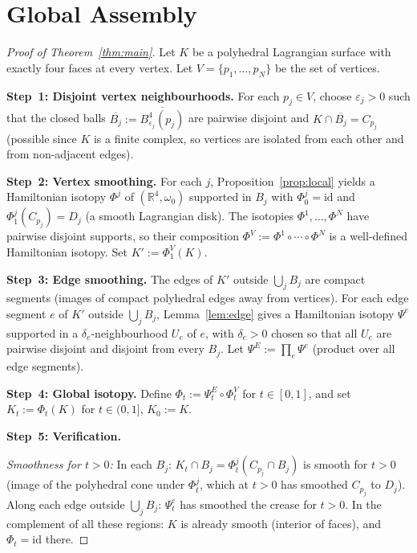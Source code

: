 \documentclass[12pt]{article}
\theoremstyle{definition}
\newcommand{\R}{\mathbb{R}}
\newcommand{\om}{\omega}
\newcommand{\eps}{\varepsilon}
\begin{document}
\section{Global Assembly}\label{sec:global}

\begin{proof}[Proof of Theorem~\ref{thm:main}]
Let $K$ be a polyhedral Lagrangian surface with exactly four faces at
every vertex.  Let $V=\{p_1,\dots,p_N\}$ be the set of vertices.

\medskip\noindent
\textbf{Step~1: Disjoint vertex neighbourhoods.}
For each $p_j\in V$, choose $\eps_j>0$ such that the closed balls
$\overline{B_j}:=\overline{B^4_{\eps_j}(p_j)}$ are pairwise disjoint and
$K\cap\overline{B_j}=C_{p_j}$ (possible since $K$ is a finite complex,
so vertices are isolated from each other and from non-adjacent edges).

\medskip\noindent
\textbf{Step~2: Vertex smoothing.}
For each $j$, Proposition~\ref{prop:local} yields a Hamiltonian
isotopy $\Phi^j$ of $(\R^4,\om_0)$ supported in $B_j$ with
$\Phi^j_0=\mathrm{id}$ and $\Phi^j_1(C_{p_j})=D_j$ (a smooth Lagrangian
disk).  The isotopies $\Phi^1,\dots,\Phi^N$ have pairwise disjoint
supports, so their composition $\Phi^V:=\Phi^1\circ\cdots\circ\Phi^N$
is a well-defined Hamiltonian isotopy.  Set $K':=\Phi^V_1(K)$.

\medskip\noindent
\textbf{Step~3: Edge smoothing.}
The edges of $K'$ outside $\bigcup_j B_j$ are compact segments (images
of compact polyhedral edges away from vertices).  For each edge segment
$e$ of $K'$ outside $\bigcup_j B_j$, Lemma~\ref{lem:edge} gives a
Hamiltonian isotopy $\Psi^e$ supported in a $\delta_e$-neighbourhood
$U_e$ of $e$, with $\delta_e>0$ chosen so that all $U_e$ are pairwise
disjoint and disjoint from every $B_j$.  Let
$\Psi^E:=\prod_e\Psi^e$ (product over all edge segments).

\medskip\noindent
\textbf{Step~4: Global isotopy.}
Define $\Phi_t:=\Psi^E_t\circ\Phi^V_t$ for $t\in[0,1]$, and set
$K_t:=\Phi_t(K)$ for $t\in(0,1]$, $K_0:=K$.

\medskip\noindent
\textbf{Step~5: Verification.}

\emph{Smoothness for $t>0$:}
In each $B_j$: $K_t\cap B_j=\Phi^j_t(C_{p_j}\cap B_j)$ is smooth for
$t>0$ (image of the polyhedral cone under $\Phi^j_t$, which at $t>0$
has smoothed $C_{p_j}$ to $D_j$).
Along each edge outside $\bigcup_j B_j$: $\Psi^e_t$ has smoothed the
crease for $t>0$.
In the complement of all these regions: $K$ is already smooth
(interior of faces), and $\Phi_t=\mathrm{id}$ there.


\end{proof}
\end{document}
